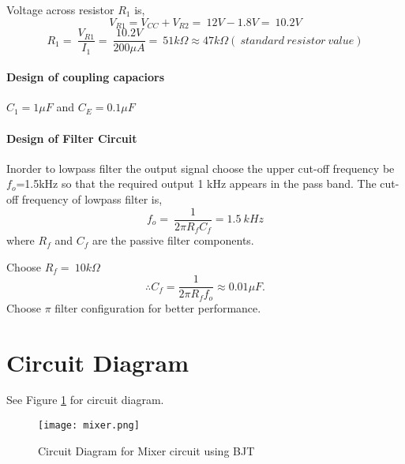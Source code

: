 \noindent Voltage across resistor $R_1$ is,
\begin{equation}
V_{R1}= V_{CC} +V_{R2} =\ 12V-1.8V=\ 10.2 V
\end{equation}
 \begin{equation}
R_1=\ \frac{V_{R1}}{I_1}= \ \frac{10.2V}{200 \mu A}=\ 51k\Omega \approx 47 k\Omega (\ standard \ resistor \ value)
\end{equation}

\paragraph{Design of coupling capaciors\\}
\noindent $C_1 = 1 \mu F$ and $C_E = 0.1 \mu F $

\paragraph{Design of Filter Circuit\\}

\noindent Inorder to lowpass filter the output signal choose the upper cut-off frequency be $f_o$=1.5kHz so that the required output 1 kHz appears in the pass band.
\noindent The cut-off frequency of lowpass filter is,
\begin{equation}
f_o=\ \frac{1}{2\pi R_fC_f}=1.5\ kHz
\end{equation}
\noindent where $R_f$ and $C_f$ are the passive filter components.

Choose $R_f=\ 10k\Omega$
\begin{equation}
\therefore C_f=\frac{1}{2\pi R_f f_o} \approx 0.01 \mu F.
\end{equation}
\noindent Choose $\pi$ filter configuration for better performance.
\section*{Circuit Diagram}
See Figure \ref{mixer} for circuit diagram.
\begin{figure}[h]
\texttt{[image: mixer.png]}
\caption{Circuit Diagram for Mixer circuit using BJT}
\label{mixer}
\end{figure}
